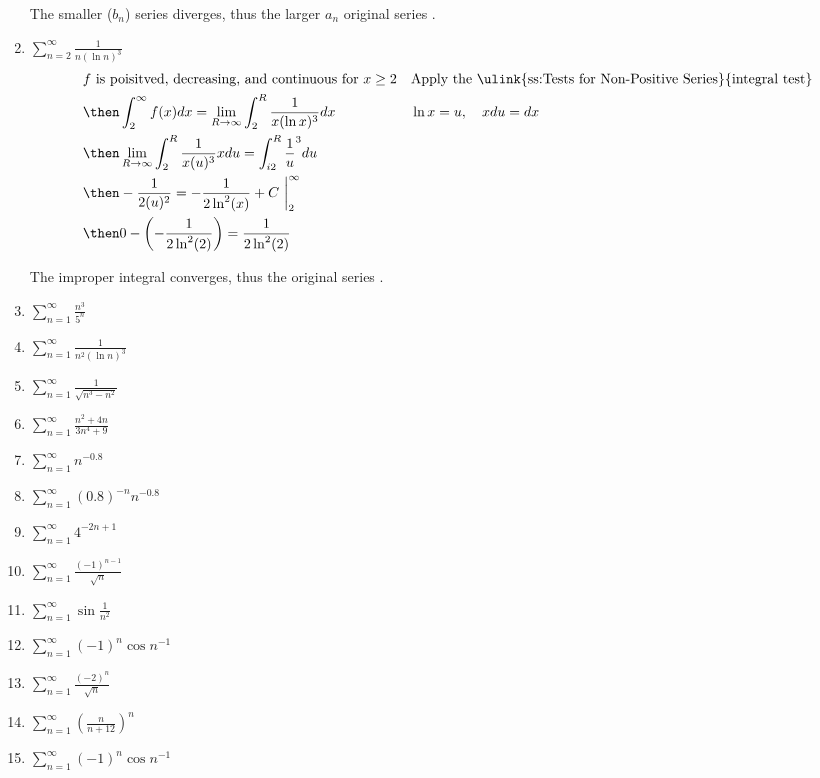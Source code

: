 \begin{enumerate}[itemsep=3em]
  The smaller (\(b_n\)) series diverges, thus the larger \(a_n\) original
  series .

  \item \(\displaystyle \sum_{n=2}^{\infty} \frac{1}{n(\ln n)^3} \)
  \begin{align*}
    &f~\text{is poisitved, decreasing, and continuous for}~x\geq 2
    && \text{Apply the \ulink{ss:Tests for Non-Positive Series}{integral test}} \\
    &\then \int_{2}^{\infty} f(x)dx = \lim_{R \to \infty} \int_{2}^{R}
    \frac{1}{x(\ln x)^3} dx && \ln x = u, \quad xdu = dx \\
    &\then \lim_{R \to \infty} \int_{2}^{R} \frac{1}{x(u)^3} xdu =
    \int_{i2}^{R} \frac{1}{u}^3 du \\
    &\then -\frac{1}{2(u)^2} = -\frac{1}{2\ln ^2(x)} + C ~\bigg|_{2}^{\infty} \\
    &\then 0 - \left(-\frac{1}{2\ln ^2(2)}\right) = \frac{1}{2\ln ^2(2)}
  \end{align*}

  The improper integral converges, thus the original series .

  \item \(\displaystyle \sum_{n=1}^{\infty} \frac{n^3}{5^n} \)

  \item \(\displaystyle \sum_{n=1}^{\infty} \frac{1}{n^2(\ln n)^3} \)

  \item \(\displaystyle \sum_{n=1}^{\infty} \frac{1}{\sqrt{n^3 - n^2}} \)

  \item \(\displaystyle \sum_{n=1}^{\infty} \frac{n^2 + 4n}{3n^4 + 9} \)

  \item \(\displaystyle \sum_{n=1}^{\infty} n^{-0.8}\)

  \item \(\displaystyle \sum_{n=1}^{\infty} (0.8)^{-n} n^{-0.8}  \)

  \item \(\displaystyle \sum_{n=1}^{\infty} 4^{-2n+1}  \)

  \item \(\displaystyle \sum_{n=1}^{\infty} \frac{(-1)^{n-1}}{\sqrt{n} }  \)

  \item \(\displaystyle \sum_{n=1}^{\infty} \sin \frac{1}{n^2}  \)

  \item \(\displaystyle \sum_{n=1}^{\infty} (-1)^n \cos n^{-1} \)

  \item \(\displaystyle \sum_{n=1}^{\infty} \frac{(-2)^n}{\sqrt{n} } \)

  \item \(\displaystyle \sum_{n=1}^{\infty} \left( \frac{n}{n+12} \right)^n \)

  \item \(\displaystyle \sum_{n=1}^{\infty} (-1)^n \cos n^{-1} \)


\end{enumerate}


